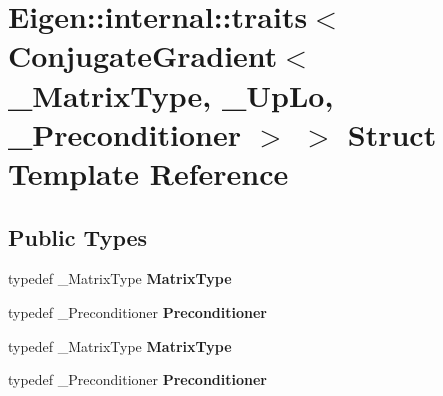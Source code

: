 \hypertarget{struct_eigen_1_1internal_1_1traits_3_01_conjugate_gradient_3_01___matrix_type_00_01___up_lo_00_01___preconditioner_01_4_01_4}{}\section{Eigen\+:\+:internal\+:\+:traits$<$ Conjugate\+Gradient$<$ \+\_\+\+Matrix\+Type, \+\_\+\+Up\+Lo, \+\_\+\+Preconditioner $>$ $>$ Struct Template Reference}
\label{struct_eigen_1_1internal_1_1traits_3_01_conjugate_gradient_3_01___matrix_type_00_01___up_lo_00_01___preconditioner_01_4_01_4}
\subsection*{Public Types}
\begin{DoxyCompactItemize}
\item 
\mbox{\label{struct_eigen_1_1internal_1_1traits_3_01_conjugate_gradient_3_01___matrix_type_00_01___up_lo_00_01___preconditioner_01_4_01_4_aa69c391bfcdba93f1f0ad8012d00c929}} 
typedef \+\_\+\+Matrix\+Type {\bfseries Matrix\+Type}
\item 
\mbox{\label{struct_eigen_1_1internal_1_1traits_3_01_conjugate_gradient_3_01___matrix_type_00_01___up_lo_00_01___preconditioner_01_4_01_4_ab161958cd55f7dde4d0b9b4ff271b214}} 
typedef \+\_\+\+Preconditioner {\bfseries Preconditioner}
\item 
\mbox{\label{struct_eigen_1_1internal_1_1traits_3_01_conjugate_gradient_3_01___matrix_type_00_01___up_lo_00_01___preconditioner_01_4_01_4_aa69c391bfcdba93f1f0ad8012d00c929}} 
typedef \+\_\+\+Matrix\+Type {\bfseries Matrix\+Type}
\item 
\mbox{\label{struct_eigen_1_1internal_1_1traits_3_01_conjugate_gradient_3_01___matrix_type_00_01___up_lo_00_01___preconditioner_01_4_01_4_ab161958cd55f7dde4d0b9b4ff271b214}} 
typedef \+\_\+\+Preconditioner {\bfseries Preconditioner}
\end{DoxyCompactItemize}


